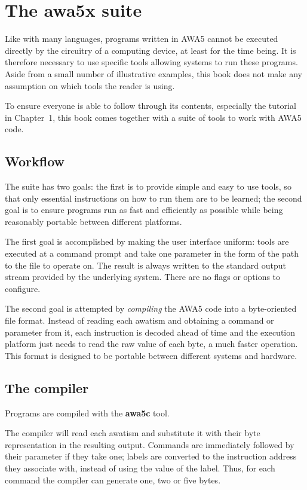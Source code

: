 \documentclass[11pt,a4paper,draft]{book}
\begin{document}
\chapter{The awa5x suite}
\label{awa5x-suite}
Like with many languages, programs written in AWA5 cannot be executed
directly by the circuitry of a computing device, at least for the time
being. It is therefore necessary to use specific tools allowing
systems to run these programs. Aside from a small number of
illustrative examples, this book does not make any assumption on which
tools the reader is using.

To ensure everyone is able to follow through its contents, especially
the tutorial in Chapter~1, this book comes together with a suite of
tools to work with AWA5 code.

\section{Workflow}
The suite has two goals: the first is to provide simple and easy to
use tools, so that only essential instructions on how to run them are
to be learned; the second goal is to ensure programs run as fast and
efficiently as possible while being reasonably portable between
different platforms.

The first goal is accomplished by making the user interface uniform:
tools are executed at a command prompt and take one parameter in the
form of the path to the file to operate on. The result is always
written to the standard output stream provided by the underlying
system. There are no flags or options to configure.

The second goal is attempted by \emph{compiling} the AWA5 code into a
byte-oriented file format. Instead of reading each awatism and
obtaining a command or parameter from it, each instruction is decoded
ahead of time and the execution platform just needs to read the raw
value of each byte, a much faster operation. This format is designed
to be portable between different systems and hardware.

\section{The compiler}
Programs are compiled with the \textbf{awa5c} tool.

The compiler will read each awatism and substitute it with their byte
representation in the resulting output. Commands are immediately
followed by their parameter if they take one; labels are converted to
the instruction address they associate with, instead of using the
value of the label. Thus, for each command the compiler can generate
one, two or five bytes.
\end{document}
